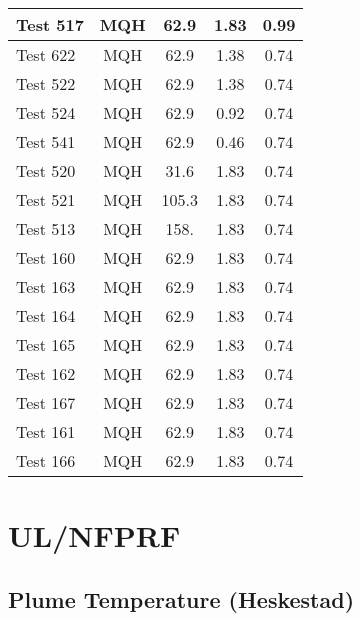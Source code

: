 \begin{table}[!h]
\begin{center}
\begin{tabular}{|l|c|c|c|c|}
Test 517   &  MQH               &  62.9           &  1.83        &  0.99        \\ \hline
Test 622   &  MQH               &  62.9           &  1.38        &  0.74        \\ \hline
Test 522   &  MQH               &  62.9           &  1.38        &  0.74        \\ \hline
Test 524   &  MQH               &  62.9           &  0.92        &  0.74        \\ \hline
Test 541   &  MQH               &  62.9           &  0.46        &  0.74        \\ \hline
Test 520   &  MQH               &  31.6           &  1.83        &  0.74        \\ \hline
Test 521   &  MQH               &  105.3          &  1.83        &  0.74        \\ \hline
Test 513   &  MQH               &  158.           &  1.83        &  0.74        \\ \hline
Test 160   &  MQH               &  62.9           &  1.83        &  0.74        \\ \hline
Test 163   &  MQH               &  62.9           &  1.83        &  0.74        \\ \hline
Test 164   &  MQH               &  62.9           &  1.83        &  0.74        \\ \hline
Test 165   &  MQH               &  62.9           &  1.83        &  0.74        \\ \hline
Test 162   &  MQH               &  62.9           &  1.83        &  0.74        \\ \hline
Test 167   &  MQH               &  62.9           &  1.83        &  0.74        \\ \hline
Test 161   &  MQH               &  62.9           &  1.83        &  0.74        \\ \hline
Test 166   &  MQH               &  62.9           &  1.83        &  0.74        \\ \hline
\end{tabular}
\end{center}
\end{table}


\clearpage


\section{UL/NFPRF}

\subsection*{Plume Temperature (Heskestad)}

